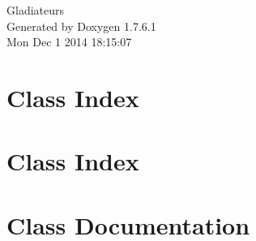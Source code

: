 \documentclass[a4paper]{book}
\begin{document}
\hypersetup{pageanchor=false,citecolor=blue}
\begin{titlepage}
\vspace*{7cm}
\begin{center}
{\Large \-Gladiateurs }\\
\vspace*{1cm}
{\large \-Generated by Doxygen 1.7.6.1}\\
\vspace*{0.5cm}
{\small Mon Dec 1 2014 18:15:07}\\
\end{center}
\end{titlepage}
\clearemptydoublepage
{}
\tableofcontents
\clearemptydoublepage
{}
\hypersetup{pageanchor=true,citecolor=blue}
\chapter{\-Class \-Index}

\chapter{\-Class \-Index}

\chapter{\-Class \-Documentation}



































\printindex
\end{document}
